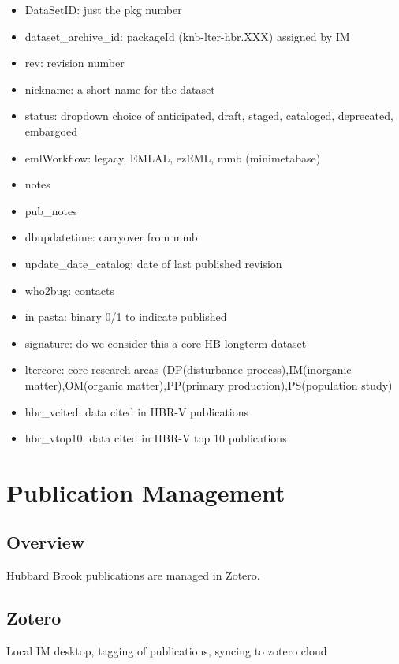 \documentclass[
  letterpaper,
  DIV=11,
  numbers=noendperiod]{scrreprt}
\providecommand{\tightlist}{%
  \setlength{\itemsep}{0pt}\setlength{\parskip}{0pt}}\usepackage{longtable,booktabs,array}
\begin{document}
\begin{itemize}
\tightlist
\item
  DataSetID: just the pkg number
\item
  dataset\_archive\_id: packageId (knb-lter-hbr.XXX) assigned by IM
\item
  rev: revision number
\item
  nickname: a short name for the dataset
\item
  status: dropdown choice of anticipated, draft, staged, cataloged,
  deprecated, embargoed
\item
  emlWorkflow: legacy, EMLAL, ezEML, mmb (minimetabase)
\item
  notes
\item
  pub\_notes
\item
  dbupdatetime: carryover from mmb
\item
  update\_date\_catalog: date of last published revision
\item
  who2bug: contacts
\item
  in pasta: binary 0/1 to indicate published
\item
  signature: do we consider this a core HB longterm dataset
\item
  ltercore: core research areas (DP(disturbance process),IM(inorganic
  matter),OM(organic matter),PP(primary production),PS(population study)
\item
  hbr\_vcited: data cited in HBR-V publications
\item
  hbr\_vtop10: data cited in HBR-V top 10 publications
\end{itemize}


\chapter{Publication Management}\label{publication-management}

\section{Overview}\label{overview-3}

Hubbard Brook publications are managed in Zotero.

\section{Zotero}\label{zotero}

Local IM desktop, tagging of publications, syncing to zotero cloud
\end{document}
